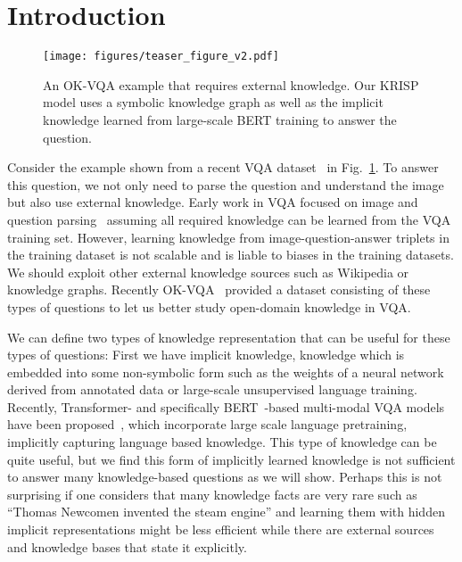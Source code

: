 \documentclass[final]{cvpr}
\providecommand{\ModelName}{KRISP\xspace}
\providecommand{\sectionvspace}{\vspace{-0cm}}
\begin{document}
\section{Introduction}
\sectionvspace

\begin{figure}[t]
\centering
\texttt{[image: figures/teaser\_figure\_v2.pdf]}
\caption{An OK-VQA example that requires external knowledge.
Our \ModelName model 
uses a symbolic knowledge graph as well as the implicit knowledge learned from large-scale BERT training to answer the question.}
\label{fig:teaser}
\end{figure}

Consider the example shown from a recent VQA dataset~\cite{marino19cvpr} in Fig.~\ref{fig:teaser}. 
To answer this question, we not only need to parse the question and understand the image but also use external knowledge. Early work in VQA focused on image and question parsing~
\cite{agrawal17, antol15, fukui16, malinowski14a, malinowski15} assuming  all required knowledge can be learned from the VQA training set. However, learning knowledge from image-question-answer triplets in the training dataset is not scalable and is liable to biases in the training datasets. We should exploit other external knowledge sources such as Wikipedia or knowledge graphs. Recently OK-VQA~\cite{marino19cvpr} provided a dataset consisting of these types of questions to let us better study open-domain knowledge in VQA.

We can define two types of knowledge representation that can be useful for these types of questions: First we have implicit knowledge, knowledge which is embedded into some non-symbolic form such as the weights of a neural network derived from annotated data
or large-scale unsupervised language training. Recently, Transformer- and specifically BERT~\cite{devlin19bert}-based multi-modal VQA models have been proposed~\cite{li2019visualbert, lu19vilbert, lu202012}, which incorporate large scale language pretraining, implicitly capturing language based knowledge. 
This type of knowledge can be quite useful, but we find this form of implicitly learned knowledge is not sufficient to answer many knowledge-based questions as we will show. 
Perhaps this is not surprising if one considers that many knowledge facts are very rare such as ``Thomas Newcomen invented the steam engine'' and learning them with hidden implicit representations might be less efficient while there are external sources and knowledge bases that state it explicitly. 
\end{document}
